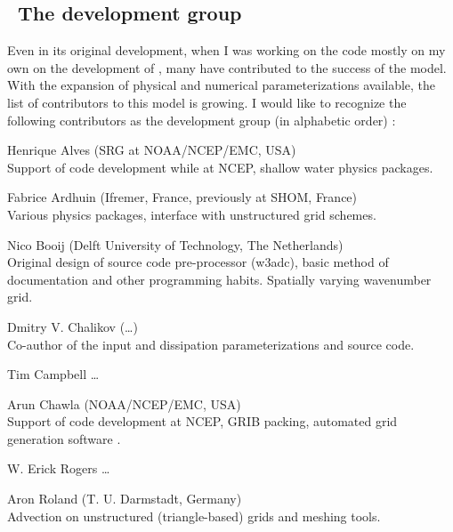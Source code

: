 \vssub
\subsection{~The development group}
\vssub

Even in its original development, when I was working on the code mostly on my
own on the development of \ws, many have contributed to the success of the
model. With the expansion of physical and numerical parameterizations
available, the list of contributors to this model is growing. I would like to
recognize the following contributors as the development group (in alphabetic
order) :

\begin{list}{\ldots}{ }

\item [Henrique Alves] (SRG at NOAA/NCEP/EMC, USA) \\
  Support of code development while at NCEP, shallow water physics packages.

\item [Fabrice Ardhuin] (Ifremer, France, previously at SHOM, France) \\
  Various physics packages, interface with unstructured grid schemes.

\item [Nico Booij] (Delft University of Technology, The Netherlands) \\
  Original design of source code pre-processor ({\code w3adc}), basic method
  of documentation and other programming habits. Spatially varying wavenumber
  grid.

\item [Dmitry V. Chalikov] (\ldots) \\ Co-author of the
  \cite{tol:JPO96} input and dissipation parameterizations and source code.

\item [Tim Campbell] \ldots

\item [Arun Chawla](NOAA/NCEP/EMC, USA) \\
  Support of code development at NCEP, GRIB packing, automated grid generation
  software \citep{tol:MMAB07a, tol:OMOD08a}.

\item [W. Erick Rogers] \ldots

\item [Aron Roland] (T. U. Darmstadt, Germany) \\
  Advection on unstructured (triangle-based) grids and meshing tools.


\end{list}
